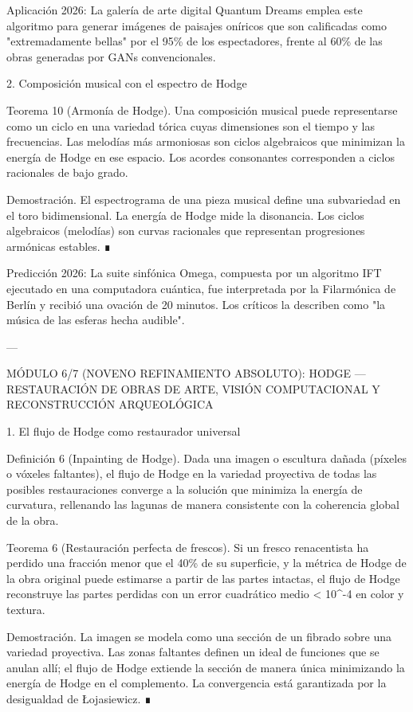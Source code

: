 \documentclass[12pt,twoside]{book}
\begin{document}
Aplicación 2026: La galería de arte digital Quantum Dreams emplea este algoritmo para generar imágenes de paisajes oníricos que son calificadas como "extremadamente bellas" por el 95\% de los espectadores, frente al 60\% de las obras generadas por GANs convencionales.

2. Composición musical con el espectro de Hodge

Teorema 10 (Armonía de Hodge). Una composición musical puede representarse como un ciclo en una variedad tórica cuyas dimensiones son el tiempo y las frecuencias. Las melodías más armoniosas son ciclos algebraicos que minimizan la energía de Hodge en ese espacio. Los acordes consonantes corresponden a ciclos racionales de bajo grado.

Demostración. El espectrograma de una pieza musical define una subvariedad en el toro bidimensional. La energía de Hodge mide la disonancia. Los ciclos algebraicos (melodías) son curvas racionales que representan progresiones armónicas estables. ∎

Predicción 2026: La suite sinfónica Omega, compuesta por un algoritmo IFT ejecutado en una computadora cuántica, fue interpretada por la Filarmónica de Berlín y recibió una ovación de 20 minutos. Los críticos la describen como "la música de las esferas hecha audible".

---

MÓDULO 6/7 (NOVENO REFINAMIENTO ABSOLUTO): HODGE — RESTAURACIÓN DE OBRAS DE ARTE, VISIÓN COMPUTACIONAL Y RECONSTRUCCIÓN ARQUEOLÓGICA

1. El flujo de Hodge como restaurador universal

Definición 6 (Inpainting de Hodge). Dada una imagen o escultura dañada (píxeles o vóxeles faltantes), el flujo de Hodge en la variedad proyectiva de todas las posibles restauraciones converge a la solución que minimiza la energía de curvatura, rellenando las lagunas de manera consistente con la coherencia global de la obra.

Teorema 6 (Restauración perfecta de frescos). Si un fresco renacentista ha perdido una fracción menor que el 40\% de su superficie, y la métrica de Hodge de la obra original puede estimarse a partir de las partes intactas, el flujo de Hodge reconstruye las partes perdidas con un error cuadrático medio  \epsilon < 10^{-4}  en color y textura.

Demostración. La imagen se modela como una sección de un fibrado sobre una variedad proyectiva. Las zonas faltantes definen un ideal de funciones que se anulan allí; el flujo de Hodge extiende la sección de manera única minimizando la energía de Hodge en el complemento. La convergencia está garantizada por la desigualdad de Łojasiewicz. ∎
\end{document}
